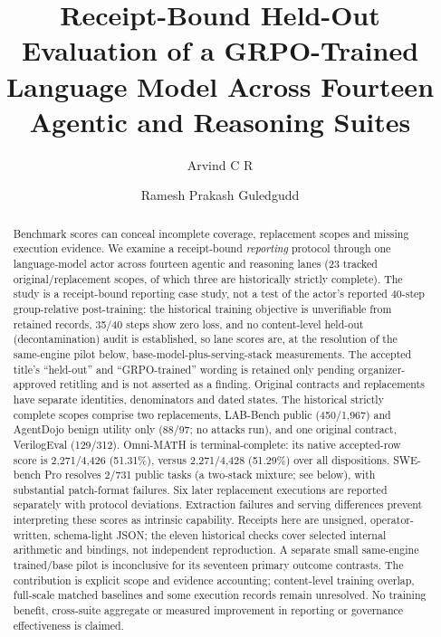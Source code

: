 \documentclass[a4paper,runningheads]{llncs}
\begin{document}
\title{Receipt-Bound Held-Out Evaluation of a GRPO-Trained Language Model Across Fourteen Agentic and Reasoning Suites}
\author{Arvind C R \and Ramesh Prakash Guledgudd}
\maketitle
\begin{abstract}
Benchmark scores can conceal incomplete coverage, replacement scopes and missing
execution evidence. We examine a receipt-bound \emph{reporting} protocol through one
language-model actor across fourteen agentic and reasoning lanes (23 tracked
original/replacement scopes, of which three are historically strictly complete).
The study is a receipt-bound reporting case study, not a test of the actor's reported
40-step group-relative post-training: the historical training objective is
unverifiable from retained records, 35/40 steps show zero loss, and no
content-level held-out (decontamination) audit is established, so lane scores
are, at the resolution of the same-engine pilot below, base-model-plus-serving-stack
measurements. The accepted title's ``held-out'' and ``GRPO-trained'' wording is
retained only pending organizer-approved retitling and is not asserted as a
finding. Original contracts and replacements have
separate identities, denominators and dated states. The historical strictly
complete scopes comprise two replacements, LAB-Bench public (450/1,967) and
AgentDojo benign utility only (88/97; no attacks run), and one original contract, VerilogEval
(129/312). Omni-MATH is terminal-complete: its native accepted-row score is
2,271/4,426 (51.31\%), versus 2,271/4,428 (51.29\%) over all dispositions.
SWE-bench Pro resolves 2/731 public tasks (a two-stack mixture; see below), with substantial patch-format failures.
Six later replacement executions are reported separately with protocol
deviations. Extraction failures and serving differences prevent interpreting
these scores as intrinsic capability. Receipts here are unsigned,
operator-written, schema-light JSON; the eleven historical checks cover selected
internal arithmetic and bindings, not independent reproduction. A separate small
same-engine trained/base pilot is inconclusive for its seventeen primary
outcome contrasts. The contribution is explicit scope and evidence accounting;
content-level training overlap, full-scale matched baselines and some execution
records remain unresolved. No training benefit, cross-suite aggregate or measured
improvement in reporting or governance effectiveness is claimed.
\end{abstract}
\end{document}

